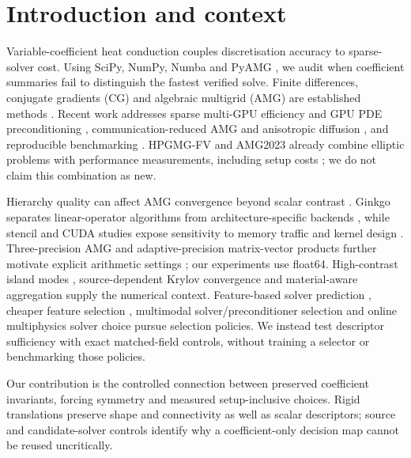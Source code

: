 \documentclass[10pt]{article}
\begin{document}
\section{Introduction and context}
Variable-coefficient heat conduction couples discretisation accuracy to sparse-solver cost. Using SciPy, NumPy, Numba and PyAMG \cite{Virtanen2020,Harris2020,Lam2015,Bell2023}, we audit when coefficient summaries fail to distinguish the fastest verified solve. Finite differences, conjugate gradients (CG) and algebraic multigrid (AMG) are established methods \cite{Strikwerda2004,Hestenes1952,Saad2003,Ruge1987}. Recent work addresses sparse multi-GPU efficiency and GPU PDE preconditioning \cite{Bernaschi2026EnergySparseMultiGPU,Welter2026HDGGPUPreconditioning}, communication-reduced AMG and anisotropic diffusion \cite{Yuan2025CRAMG,Green2022AnisotropicDiffusionSolver}, and reproducible benchmarking \cite{Koskela2023ReproBenchmark}. HPGMG-FV and AMG2023 already combine elliptic problems with performance measurements, including setup costs \cite{SPECHPGMG2021,LLNLAMG2023}; we do not claim this combination as new.\par
Hierarchy quality can affect AMG convergence beyond scalar contrast \cite{DAmbra2023Coarsening}. Ginkgo separates linear-operator algorithms from architecture-specific backends \cite{Anzt2022Ginkgo}, while stencil and CUDA studies expose sensitivity to memory traffic and kernel design \cite{Pekkila2025StencilGPUs,Makhmut2026CUDABuckleyLeverett}. Three-precision AMG and adaptive-precision matrix-vector products further motivate explicit arithmetic settings \cite{Tsai2023ThreePrecision,Graillat2024AdaptivePrecision}; our experiments use float64. High-contrast island modes \cite{Aksoylu2008,AksoyluYeter2010}, source-dependent Krylov convergence \cite{Carson2024} and material-aware aggregation \cite{Firmbach2026} supply the numerical context. Feature-based solver prediction \cite{Funk2022SolverPrediction}, cheaper feature selection \cite{Sun2025FeatureSelection}, multimodal solver/preconditioner selection \cite{Xiong2025MMAutoSolver} and online multiphysics solver choice \cite{Zabegaev2024SolverSelection} pursue selection policies. We instead test descriptor sufficiency with exact matched-field controls, without training a selector or benchmarking those policies.\par
Our contribution is the controlled connection between preserved coefficient invariants, forcing symmetry and measured setup-inclusive choices. Rigid translations preserve shape and connectivity as well as scalar descriptors; source and candidate-solver controls identify why a coefficient-only decision map cannot be reused uncritically.\par
\end{document}
